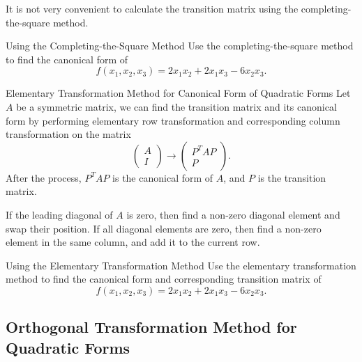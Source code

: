 \begin{note}
  It is not very convenient to calculate the transition matrix using the
  completing-the-square method.
\end{note}

\begin{example}{Using the Completing-the-Square Method}{}
  Use the completing-the-square method to find the canonical form of
  \begin{equation}
    f(x_1, x_2, x_3) = 2x_1x_2 + 2x_1x_3 - 6x_2x_3.
  \end{equation}
\end{example}

\begin{proposition}{Elementary Transformation Method for Canonical Form of
    Quadratic Forms}{}
  Let $A$ be a symmetric matrix, we can find the transition matrix and its
  canonical form by performing elementary row transformation and
  corresponding column transformation on the matrix
  \begin{equation}
    \begin{pmatrix}A\\I\end{pmatrix}\to\begin{pmatrix}P^TAP\\P\end{pmatrix}.
  \end{equation}
  After the process, $P^TAP$ is the canonical form of $A$, and $P$ is the
  transition matrix.
\end{proposition}

\begin{note}
  If the leading diagonal of $A$ is zero, then find a non-zero diagonal element
  and swap their position.
  If all diagonal elements are zero, then find a non-zero element in the same
  column, and add it to the current row.
\end{note}

\begin{example}{Using the Elementary Transformation Method}{}
  Use the elementary transformation method to find the canonical form
  and corresponding transition matrix of
  \begin{equation}
    f(x_1, x_2, x_3) = 2x_1x_2 + 2x_1x_3 - 6x_2x_3.
  \end{equation}
\end{example}

\subsection{Orthogonal Transformation Method for Quadratic Forms}


